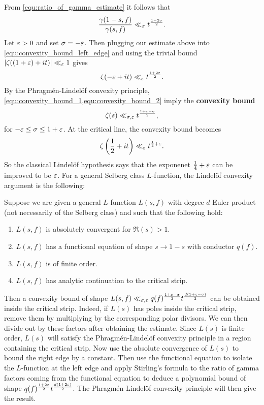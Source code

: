     From \cref{equ:ratio_of_gamma_estimate} it follows that
    \[
      \frac{\gamma(1-s,f)}{\gamma(s,f)} \ll_{\sigma} t^{\frac{1-2\sigma}{2}}.
    \]
    Let $\varepsilon > 0$ and set $\sigma = -\varepsilon$. Then plugging our estimate above into \cref{equ:convexity_bound_left_edge} and using the trivial bound $|\zeta((1+\varepsilon)+it)| \ll_{\varepsilon} 1$ gives
    \begin{equation}\label{equ:convexity_bound_2}
      \zeta(-\varepsilon+it) \ll_{\varepsilon} t^{\frac{1+2\varepsilon}{2}}.
    \end{equation}
    By the Phragm\'en-Lindel\"of convexity principle, \cref{equ:convexity_bound_1,equ:convexity_bound_2} imply the \textbf{convexity bound}
    \[
      \zeta(s) \ll_{\sigma,\varepsilon} t^{\frac{1+\varepsilon-\sigma}{2}},
    \]
    for $-\varepsilon \le \sigma \le 1+\varepsilon$. At the critical line, the convexity bound becomes
    \begin{equation}\label{equ:convexity_bound_zeta_function}
      \zeta\left(\frac{1}{2}+it\right) \ll_{\varepsilon} t^{\frac{1}{4}+\varepsilon}.
    \end{equation}
    So the classical Lindel\"of hypothesis says that the exponenet $\frac{1}{4}+\varepsilon$ can be improved to be $\varepsilon$. For a general Selberg class $L$-function, the Lindel\"of convexity argument is the following:

    \begin{method}
      Suppose we are given a general $L$-function $L(s,f)$ with degree $d$ Euler product (not necessarily of the Selberg class) and such that the following hold:
      \begin{enumerate}[label=(\roman*)]
        \item $L(s,f)$ is absolutely convergent for $\Re(s) > 1$.
        \item $L(s,f)$ has a functional equation of shape $s \to 1-s$ with conductor $q(f)$.
        \item $L(s,f)$ is of finite order.
        \item $L(s,f)$ has analytic continuation to the critical strip.
      \end{enumerate}
      Then a convexity bound of shape $L(s,f) \ll_{\sigma,\varepsilon} q(f)^{\frac{1+\varepsilon-\sigma}{2}}t^{\frac{d(1+\varepsilon-\sigma)}{2}}$ can be obtained inside the critical strip. Indeed, if $L(s)$ has poles inside the critical strip, remove them by multiplying by the corresponding polar divisors. We can then divide out by these factors after obtaining the estimate. Since $L(s)$ is finite order, $L(s)$ will satisfy the Phragm\'en-Lindel\"of convexity principle in a region containing the critical strip. Now use the absolute convergence of $L(s)$ to bound the right edge by a constant. Then use the functional equation to isolate the $L$-function at the left edge and apply Stirling's formula to the ratio of gamma factors coming from the functional equation to deduce a polynomial bound of shape $q(f)^{\frac{1+2\varepsilon}{2}}t^{\frac{d(1+2\varepsilon)}{2}}$. The Phragm\'en-Lindel\"of convexity principle will then give the result.
    \end{method}


